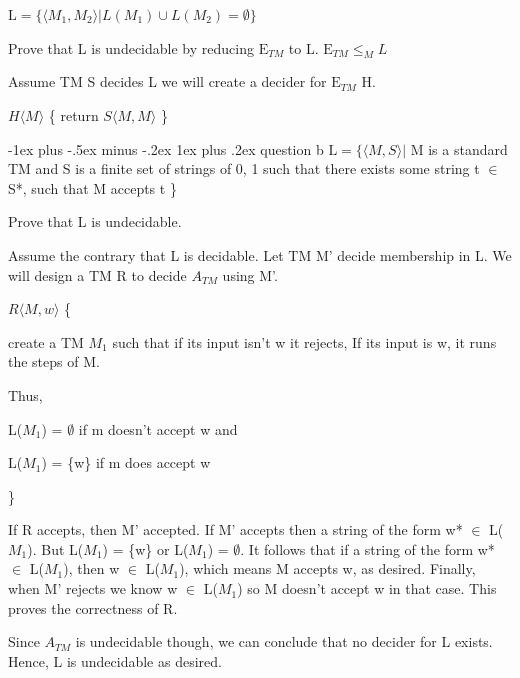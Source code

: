 \documentclass[10pt,landscape]{article}
\makeatletter
\renewcommand{\subsubsection}{\@startsection{subsubsection}{3}{0mm}%
                                {-1ex plus -.5ex minus -.2ex}%
                                {1ex plus .2ex}%
                                {\normalfont\small\bfseries}}
\makeatother
\begin{document}
\begin{multicols}{3}
$\mathrm{L} = \{ \langle{ M_1, M_2 \rangle} | L(M_1) \cup L(M_2) = \emptyset \}$

Prove that L is undecidable by reducing $\mathrm{E}_{TM}$ to L.
$\mathrm{E}_{TM} \leq_M L$

Assume TM S decides L we will create a decider for $\mathrm{E}_{TM}$ H.

\begin{algorithm}[H]
 $H \langle{ M\rangle}$ \{
  return $S\langle{M,M\rangle}$
 \}
\end{algorithm}

\subsubsection{question b}
$\mathrm{L} = \{ \langle{ M, S \rangle} | $ M is a standard TM and S is a finite set of strings of {0, 1} such that there exists some string t $\in$ S*, such that M accepts t  \}

Prove that L is undecidable.

Assume the contrary that L is decidable. Let TM M' decide membership in L. We will design a TM R to decide $A_{TM}$ using M'.

\begin{algorithm}[H]
 $R \langle{ M, w \rangle}$ \{

 create a TM $M_1$ such that if its input isn't w it rejects, If its input is w, it runs the steps of M.

 Thus, 

 L($M_1$) = $\emptyset$ if m doesn't accept w and

 L($M_1$) = \{w\} if m does accept w 

 \}
\end{algorithm}

If R accepts, then M' accepted. If M' accepts then a string of the form w* $\in$ L($M_1$). But L($M_1$) = \{w\} or L($M_1$) = $\emptyset$. It follows that if a string of the form w* $\in$ L($M_1$), then w $\in$ L($M_1$), which means M accepts w, as desired. Finally, when M' rejects we know w $\in$ L($M_1$) so M doesn't accept w in that case. This proves the correctness of R.

Since $A_{TM}$ is undecidable though, we can conclude that no decider for L exists. Hence, L is undecidable as desired. 




\end{multicols}
\end{document}
